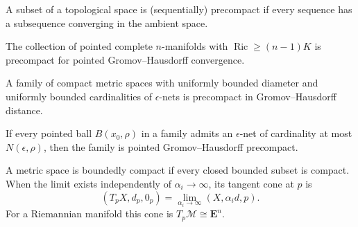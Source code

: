 \begin{definition}[Precompactness]
\label{def:chow-iii-g16-precompactness}
A subset of a topological space is (sequentially) precompact if every sequence
has a subsequence converging in the ambient space.
\end{definition}

\begin{theorem}
\label{thm:chow-iii-g17-gromov-precompactness}
The collection of pointed complete $n$-manifolds with
$\operatorname{Ric}\ge(n-1)K$ is precompact for pointed
Gromov--Hausdorff convergence.
\end{theorem}

\begin{theorem}
\label{thm:chow-iii-g18-total-boundedness}
A family of compact metric spaces with uniformly bounded diameter and uniformly
bounded cardinalities of $\epsilon$-nets is precompact in Gromov--Hausdorff
distance.
\end{theorem}

\begin{theorem}
\label{thm:chow-iii-g19-pointed-total-boundedness}
If every pointed ball $B(x_0,\rho)$ in a family admits an $\epsilon$-net of
cardinality at most $N(\epsilon,\rho)$, then the family is pointed
Gromov--Hausdorff precompact.
\end{theorem}

\begin{definition}
\label{def:chow-iii-g20-tangent-cone}

A metric space is boundedly compact if every closed bounded subset is compact.
When the limit exists independently of $\alpha_i\to\infty$, its tangent cone at
$p$ is
\[
(T_pX,d_p,0_p)=\lim_{\alpha_i\to\infty}(X,\alpha_i d,p).
\]
For a Riemannian manifold this cone is $T_p\mathcal M\cong\mathbf E^n$.
\end{definition}

